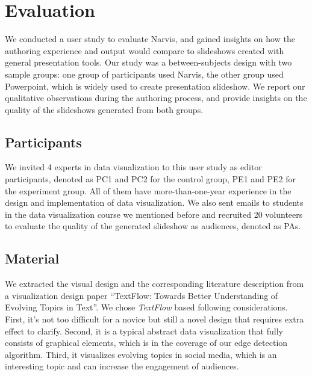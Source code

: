 \section{Evaluation}

We conducted a user study to evaluate Narvis, and gained insights on how the authoring experience and output would compare to slideshows created with general presentation tools. Our study was a between-subjects design with two sample groups: one group of participants used Narvis, the other group used Powerpoint, which is widely used to create presentation slideshow. 
We report our qualitative observations during the authoring process, and provide insights on the quality of the slideshows generated from both groups.

\subsection{Participants}
We invited 4 experts in data visualization to this user study as editor participants, denoted as PC1 and PC2 for the control group, PE1 and PE2 for the experiment group. All of them have more-than-one-year experience in the design and implementation of data visualization. We also sent emails to students in the data visualization course we mentioned before and recruited 20 volunteers to evaluate the quality of the generated slideshow as audiences, denoted as PAs. 
\subsection{Material}
We extracted the visual design and the corresponding literature description from  a visualization design paper ``TextFlow: Towards Better Understanding of Evolving Topics in Text''\cite{cui_textflow:_2011}.
We chose \textit{TextFlow} based following considerations. First, it's not too difficult for a novice but still a novel design that requires extra effect to clarify.
Second, it is a typical abstract data visualization that fully consists of graphical elements, which is in the coverage of our edge detection algorithm. 
Third, it visualizes evolving topics in social media, which is an interesting topic and can increase the engagement of audiences. 

